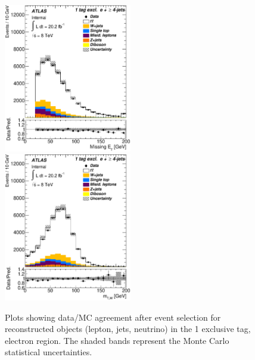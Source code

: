 \begin{figure}[!hb]
\begin{center}
		\includegraphics[height=65mm]{chapters/whel/figures/control_Plots2/bTag_1excl/MissingEt_el}
        \includegraphics[height=65mm]{chapters/whel/figures/control_Plots2/bTag_1excl/TransverseMass_el}
	\caption{Plots showing data/MC agreement after event selection for reconstructed objects (lepton, jets, neutrino) in the 1 exclusive \bt tag, electron region. The shaded bands represent the Monte Carlo statistical uncertainties.}
	\label{fig:control_plots_el_1excl}
	\end{center}
	\end{figure}
	
